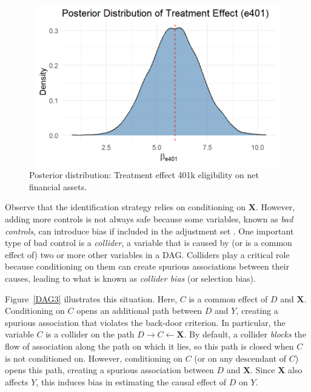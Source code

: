 \begin{figure}
	\includegraphics[width=340pt, height=200pt]{Chapters/chapter12/figures/TE401k.png}
	\caption[List of figure caption goes here]{Posterior distribution: Treatment effect 401k eligibility on net financial assets.}\label{fig12_1}
\end{figure}

Observe that the identification strategy relies on conditioning on $\mathbf{X}$. However, adding more controls is not always safe because some variables, known as \textit{bad controls}, can introduce bias if included in the adjustment set \cite{angrist2009mostly}. One important type of bad control is a \textit{collider}, a variable that is caused by (or is a common effect of) two or more other variables in a DAG. Colliders play a critical role because conditioning on them can create spurious associations between their causes, leading to what is known as \textit{collider bias} (or selection bias).

Figure~\ref{DAG3} illustrates this situation. Here, $C$ is a common effect of $D$ and $\mathbf{X}$. Conditioning on $C$ opens an additional path between $D$ and $Y$, creating a spurious association that violates the back-door criterion. In particular, the variable $C$ is a collider on the path $D \to C \leftarrow \mathbf{X}$. By default, a collider \textit{blocks} the flow of association along the path on which it lies, so this path is closed when $C$ is not conditioned on. However, conditioning on $C$ (or on any descendant of $C$) opens this path, creating a spurious association between $D$ and $\mathbf{X}$. Since $\mathbf{X}$ also affects $Y$, this induces bias in estimating the causal effect of $D$ on $Y$.\\ 

